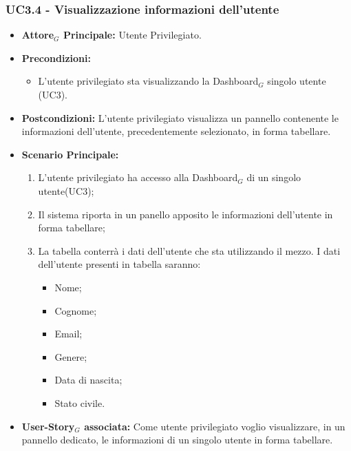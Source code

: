 \documentclass[11pt]{article}
\begin{document}
\begin{justify}
\subsubsection{\textbf{UC3.4 - Visualizzazione informazioni dell'utente}}
\label{UC3.4}
\begin{itemize}
     \item \textbf{Attore$_G$ Principale:} Utente Privilegiato.
     \item \textbf{Precondizioni:}
        \begin{itemize}
    		\item L'utente privilegiato sta visualizzando la Dashboard$_G$ singolo utente (UC3).
        \end{itemize}
      \item \textbf{Postcondizioni:} L'utente privilegiato visualizza un pannello contenente le informazioni dell'utente, precedentemente selezionato, in forma tabellare. 
      \item \textbf{Scenario Principale:}
        \begin{enumerate}
            \item L'utente privilegiato ha accesso alla Dashboard$_G$ di un singolo utente(UC3);
            \item Il sistema riporta  in un panello apposito le informazioni dell'utente in forma tabellare;
            \item La tabella conterrà i dati dell'utente che sta utilizzando il mezzo. I dati dell'utente presenti in tabella saranno:
              \begin{itemize}
              \item Nome;
              \item Cognome;
              \item Email;
              \item Genere;
              \item Data di nascita;
              \item Stato civile.
              \end{itemize}
        \end{enumerate}
     \item \textbf{User-Story$_G$ associata:}
       Come utente privilegiato voglio visualizzare, in un pannello dedicato, le informazioni di un singolo utente in forma tabellare.
\end{itemize}


\end{justify}
\end{document}
